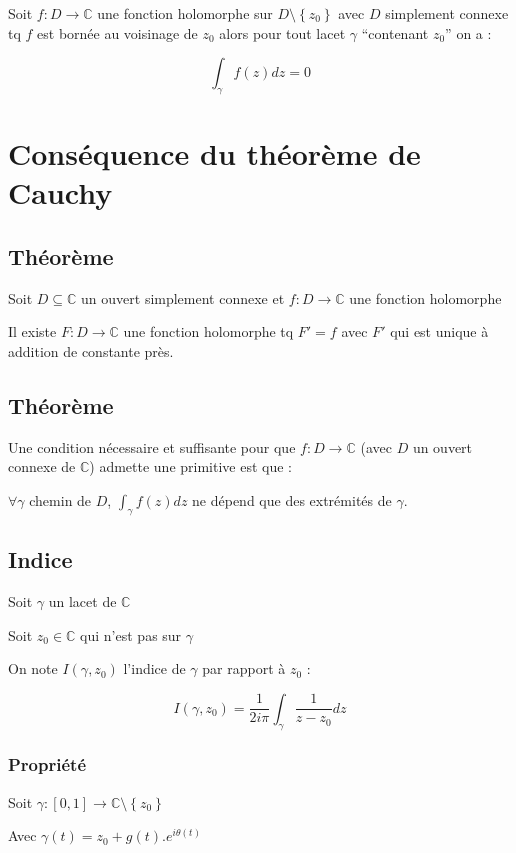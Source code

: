 \documentclass[a4paper,10pt]{report}
\newcommand{\ap}{\rightarrow}
\newcommand{\C}{\mathbb{C}}
\newcommand{\tset}[1]{\left\lbrace #1 \right\rbrace}
\begin{document}
Soit $f : D \ap \C$ une fonction holomorphe sur $D \setminus\tset{z_0}$ avec
$D$ simplement connexe tq $f$ est bornée au voisinage de $z_0$ alors pour tout
lacet $\gamma$ ``contenant $z_0$'' on a :

\[ \int_\gamma f(z) dz = 0 \]

\section{Conséquence du théorème de Cauchy}

\subsection{Théorème}

Soit $D \subseteq \C$ un ouvert simplement connexe et $f: D \ap \C$ une
fonction holomorphe

Il existe $F : D \ap \C$ une fonction holomorphe tq $F' = f$ avec $F'$ qui est
unique à addition de constante près.

\subsection{Théorème}

Une condition nécessaire et suffisante pour que $f : D \ap \C$ (avec $D$ un
ouvert connexe de $\C$) admette une primitive est que :

$\forall \gamma$ chemin de $D$, $\int_\gamma f(z) dz$ ne dépend que des
extrémités de $\gamma$.

\subsection{Indice}

Soit $\gamma$ un lacet de $\C$

Soit $z_0 \in \C$ qui n'est pas sur $\gamma$

On note $I(\gamma,z_0)$ l'indice de $\gamma$ par rapport à $z_0$ :

\[I(\gamma,z_0) = \frac{1}{2i \pi} \int_\gamma \frac{1}{z-z_0} dz \]

\subsubsection{Propriété}

Soit $\gamma : [0, 1] \ap \C\setminus\tset{z_0}$

Avec $\gamma(t) = z_0 + g(t).e^{i\theta(t)}$
\end{document}
